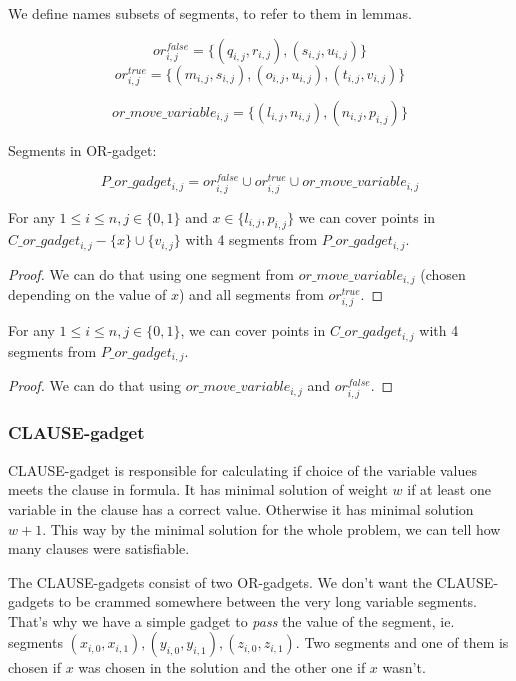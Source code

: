We define names subsets of segments, to refer to them in lemmas.
 
$$or^{false}_{i, j} =
\{ (q_{i, j}, r_{i, j}), (s_{i, j}, u_{i, j})\}$$
$$or^{true}_{i, j} =
\{ (m_{i, j}, s_{i, j}), (o_{i, j}, u_{i, j}),
(t_{i, j}, v_{i, j}) \}$$

$$or\_move\_variable_{i, j} =
\{ (l_{i, j}, n_{i, j}), (n_{i, j}, p_{i, j})\}$$

Segments in OR-gadget:

$$P\_or\_gadget_{i, j} = 
  or^{false}_{i, j} \cup or^{true}_{i, j} \cup or\_move\_variable_{i, j}
  $$


\begin{lemma}
\label{cover_or_true}
For any $1 \le i \le n, j \in \{0, 1\}$ and 
 $x \in \{l_{i, j}, p_{i, j}\}$ we can cover points in
$C\_or\_gadget_{i, j} - \{ x\} \cup \{v_{i, j}\}$
with 4 segments from $P\_or\_gadget_{i,j}$.
\end{lemma}

\begin{proof}
We can do that using one segment from
$or\_move\_variable_{i, j}$
(chosen depending on the value of $x$)
and all segments from $or^{true}_{i, j}$.
\end{proof}

\begin{lemma}
\label{cover_or_false}
For any $1 \le i \le n, j \in \{0, 1\}$, we can cover points in
$C\_or\_gadget_{i, j}$ with 4 segments from $P\_or\_gadget_{i,j}$.
\end{lemma}

\begin{proof}
We can do that using  $or\_move\_variable_{i, j}$
and $or^{false}_{i, j}$.
\end{proof}


\subsubsection{CLAUSE-gadget}


CLAUSE-gadget is responsible for calculating if choice of the
variable values meets the clause in formula.
It has minimal solution of weight $w$ if at least one variable
in the clause has a correct value.
Otherwise it has minimal solution $w+1$.
This way by the minimal solution for the whole problem, we can tell
how many clauses were satisfiable.

The CLAUSE-gadgets consist of two OR-gadgets.
We don't want the CLAUSE-gadgets to be crammed 
somewhere between
the very long variable segments. That's why we have a simple
gadget to \textit{pass} the value of the segment, ie. segments
$(x_{i, 0}, x_{i, 1}), (y_{i, 0}, y_{i, 1}), (z_{i, 0}, z_{i, 1})$.
Two segments and one of them is chosen if $x$ was chosen
in the solution and the other one if $x$ wasn't.


